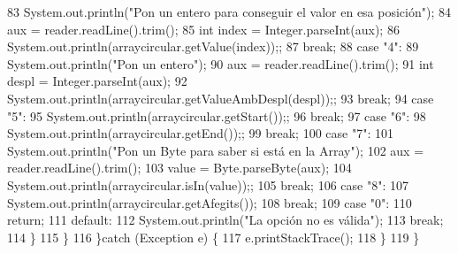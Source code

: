 \begin{DoxyCode}
83                     System.out.println(\textcolor{stringliteral}{"Pon un entero para conseguir el valor en esa posición"});
84                     aux = reader.readLine().trim();
85                     \textcolor{keywordtype}{int} index = Integer.parseInt(aux);
86                     System.out.println(arraycircular.getValue(index));;
87                 \textcolor{keywordflow}{break};
88                 \textcolor{keywordflow}{case} \textcolor{stringliteral}{"4"}:
89                     System.out.println(\textcolor{stringliteral}{"Pon un entero"});
90                     aux = reader.readLine().trim();
91                     \textcolor{keywordtype}{int} despl = Integer.parseInt(aux);
92                     System.out.println(arraycircular.getValueAmbDespl(despl));;
93                 \textcolor{keywordflow}{break};
94                 \textcolor{keywordflow}{case} \textcolor{stringliteral}{"5"}:
95                     System.out.println(arraycircular.getStart());;
96                 \textcolor{keywordflow}{break};
97                 \textcolor{keywordflow}{case} \textcolor{stringliteral}{"6"}:
98                     System.out.println(arraycircular.getEnd());;
99                 \textcolor{keywordflow}{break};
100                 \textcolor{keywordflow}{case} \textcolor{stringliteral}{"7"}:
101                     System.out.println(\textcolor{stringliteral}{"Pon un Byte para saber si está en la Array"});
102                     aux = reader.readLine().trim();
103                     value = Byte.parseByte(aux);
104                     System.out.println(arraycircular.isIn(value));;
105                 \textcolor{keywordflow}{break};
106                 \textcolor{keywordflow}{case} \textcolor{stringliteral}{"8"}:
107                     System.out.println(arraycircular.getAfegits());
108                 \textcolor{keywordflow}{break};
109                 \textcolor{keywordflow}{case} \textcolor{stringliteral}{"0"}:
110                     \textcolor{keywordflow}{return};
111                 \textcolor{keywordflow}{default}:
112                     System.out.println(\textcolor{stringliteral}{"La opción no es válida"});
113                 \textcolor{keywordflow}{break};
114             \}
115         \}
116     \}\textcolor{keywordflow}{catch} (Exception e) \{
117         e.printStackTrace();
118     \}
119     \}
\end{DoxyCode}
\mbox{\label{classdomini_1_1utils_1_1Driver____ArrayCircular_afac5a37f91b2914e692993e71c2d393c}} 
